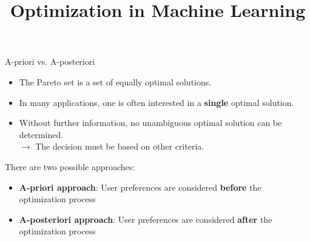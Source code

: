 \documentclass[11pt,compress,t,notes=noshow, xcolor=table]{beamer}
\title{Optimization in Machine Learning}
\date{}
\begin{document}
\sloppy



\begin{vbframe}{A-priori vs. A-posteriori}

\begin{itemize}
\item The Pareto set is a set of equally optimal solutions.
\item In many applications, one is often interested in a \textbf{single} optimal solution.
\item Without further information, no unambiguous optimal solution can be determined. \\
$\to$ The decision must be based on other criteria.
\end{itemize}

\vspace{0.5cm}

There are two possible approaches:
\begin{itemize}
\item \textbf{A-priori approach}: User preferences are considered \textbf{before} the optimization process
\item \textbf{A-posteriori approach}: User preferences are considered \textbf{after} the optimization process
\end{itemize}

\end{vbframe}
\end{document}
